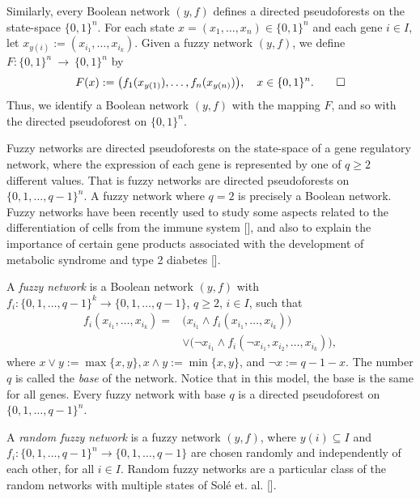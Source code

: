 \documentclass[letterpaper]{article}
\begin{document}
Similarly, every Boolean network $(y,f)$ defines a directed pseudoforests
on the state-space $\{0,1\}^n$.
For each state $x=(x_1,\dots, x_n)\in \{0,1\}^n$ and each gene $i\in I$, let $x_{y(i)}:=(x_{i_1},\dots,x_{i_k})$. 
Given  a fuzzy network $(y,f)$,  we define  $F\colon \{0,1\}^n\ \to\ \{0,1\}^n$ by  
\[
F(x):=\big(
 f_1( x_{y(1)}), \dots,
 f_n( x_{y(n)})
\big),\quad x\in \{0,1\}^n.\qedhere
\]
Thus, we identify a Boolean network $(y,f)$ with the mapping $F$, and so with the directed pseudoforest on $\{0,1\}^n$.
  
  
Fuzzy networks are directed pseudoforests on the state-space of a gene regulatory network, where the expression of each gene is represented by one of $q\geq 2$ different values. 
That is fuzzy networks are directed pseudoforests on $\{0,1,\dots,q-1\}^n$.
A fuzzy network where $q=2$ is precisely a Boolean network.
 Fuzzy networks have been recently used to study some aspects related to the differentiation of cells from the immune system [], and also to explain the importance of certain gene products associated with the development of metabolic syndrome and type 2 diabetes [].  


 A \emph{fuzzy network} is a Boolean network $(y,f)$ with $f_i\colon \{0,1,\dots,q-1\}^k\rightarrow \{0,1,\dots,q-1\}$, $q\geq 2$, $i\in I$, such that
 \begin{align*}
f_i(x_{i_1},\dots,x_{i_k})=& \big(x_{i_1}\wedge f_i(x_{i_1},\dots,x_{i_k})\big) \\
&\vee \big(\lnot x_{i_1} \wedge f_i(\lnot x_{i_1},x_{i_2},\dots,x_{i_k})\big),
  \end{align*}
  where $x\vee y:=\max\{x,y\}, x\wedge y:=\min\{x,y\}$, and $\lnot x:=q-1-x$.
  The number $q$ is called the \emph{base} of the network. 
Notice that in this model, the base  is the same for all genes.
Every fuzzy network with base $q$ is a directed pseudoforest on $\{0,1,\dots,q-1\}^n$. 

A \emph{random fuzzy network} is a fuzzy network $(y,f)$, where   $y(i)\subseteq I$ and $f_i\colon\{0,1,\dots,q-1\}^n\rightarrow\{0,1,\dots,q-1\}$ are chosen randomly and  independently of each other, for all $i\in I$.
Random fuzzy networks are a particular class of the random networks with multiple states of Sol\'e et. al. []. 
\end{document}
